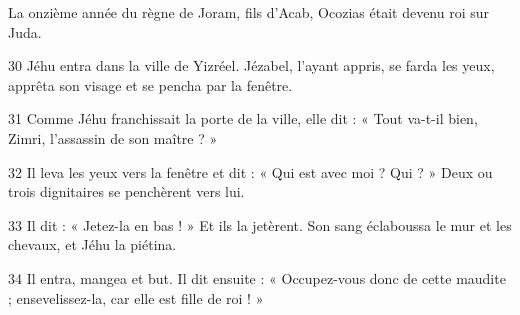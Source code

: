 La onzième année du règne de Joram, fils d’Acab, Ocozias était devenu roi sur Juda.

30 Jéhu entra dans la ville de Yizréel. Jézabel, l’ayant appris, se farda les yeux, apprêta son visage et se pencha par la fenêtre.

31 Comme Jéhu franchissait la porte de la ville, elle dit : « Tout va-t-il bien, Zimri, l’assassin de son maître ? »

32 Il leva les yeux vers la fenêtre et dit : « Qui est avec moi ? Qui ? » Deux ou trois dignitaires se penchèrent vers lui.

33 Il dit : « Jetez-la en bas ! » Et ils la jetèrent. Son sang éclaboussa le mur et les chevaux, et Jéhu la piétina.

34 Il entra, mangea et but. Il dit ensuite : « Occupez-vous donc de cette maudite ; ensevelissez-la, car elle est fille de roi ! »

